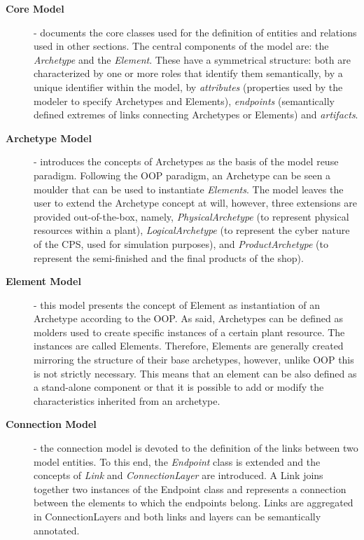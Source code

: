 \begin{description}
	\item[\textbf{Core Model}] - documents the core classes used for the definition of  entities and relations used in other sections. The central components of the model are: the \textit{Archetype} and the \textit{Element}. These have a symmetrical structure: both are characterized by one or more roles that identify them semantically, by a unique identifier within the model, by \textit{attributes} (properties used by the modeler to specify Archetypes and Elements), \textit{endpoints} (semantically defined extremes of links connecting Archetypes or Elements) and \textit{artifacts}. 
    \item [\textbf{Archetype Model}] - introduces the concepts of Archetypes as the basis of the model reuse paradigm. Following the OOP paradigm, an Archetype can be seen a moulder that can be used to instantiate \textit{Elements}. The model leaves the user to extend the Archetype concept at will, however, three extensions are provided out-of-the-box, namely, \textit{PhysicalArchetype} (to represent physical resources within a plant), \textit{LogicalArchetype} (to represent the cyber nature of the CPS, used for simulation purposes), and \textit{ProductArchetype} (to represent the semi-finished and the final products of the shop).
	\item[\textbf{Element Model}] - this model presents the concept of Element as instantiation of an Archetype according to the OOP.  As said, Archetypes can be defined as molders used to create specific instances of a certain plant resource. The instances are called Elements. Therefore, Elements are generally created mirroring the structure of their base archetypes, however, unlike  OOP  this is  not  strictly  necessary.  This  means  that  an  element  can  be also defined  as  a  stand-alone  component  or  that  it  is  possible  to add or modify the characteristics inherited from an archetype. 
	\item[\textbf{Connection Model}] - the connection model is devoted to the definition of the links between two model entities.  
To this end, the \textit{Endpoint} class is extended and the concepts of \textit{Link} and \textit{ConnectionLayer} are introduced. 
A Link joins together two instances of the Endpoint class and represents a connection between the elements to which the endpoints belong. 
Links are aggregated in ConnectionLayers and both links and layers can be semantically annotated.


\end{description}
